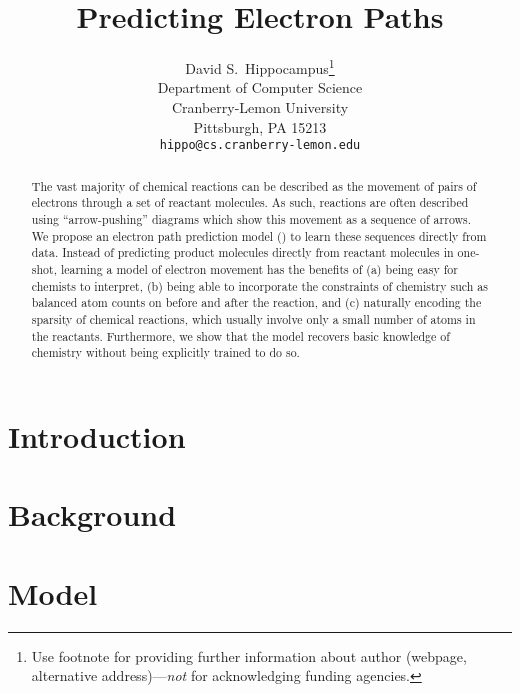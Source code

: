 \documentclass{article}
\title{Predicting Electron Paths}
\author{
  David S.~Hippocampus\thanks{Use footnote for providing further
    information about author (webpage, alternative
    address)---\emph{not} for acknowledging funding agencies.} \\
  Department of Computer Science\\
  Cranberry-Lemon University\\
  Pittsburgh, PA 15213 \\
  \texttt{hippo@cs.cranberry-lemon.edu} \\
}
\begin{document}

\maketitle

\begin{abstract}
The vast majority of chemical reactions can be described as the movement of pairs of electrons through a set of reactant molecules. 
As such, reactions are often described using ``arrow-pushing'' diagrams which show this movement as a sequence of arrows. 
We propose an electron path prediction model (\ourModel) to learn these sequences directly from data.
Instead of predicting product molecules directly from reactant molecules in one-shot, learning a model of electron movement has the benefits of 
(a) being easy for chemists to interpret, 
(b) being able to incorporate the constraints of chemistry such as balanced atom counts on before and after the reaction, and 
(c) naturally encoding the sparsity of chemical reactions, which usually involve only a small number of atoms in the reactants.
Furthermore, we show that the model recovers basic knowledge of chemistry without being explicitly trained to do so.
\end{abstract}


\section{Introduction}




\section{Background}





\section{Model}
\label{sec:model}










\end{document}
